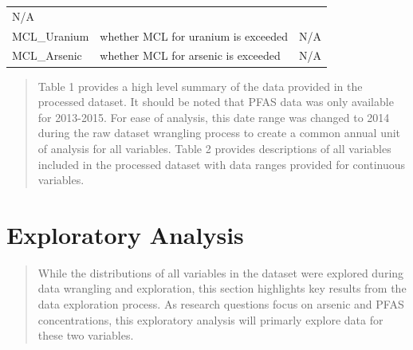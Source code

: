 \documentclass[12pt,]{article}
\begin{document}
\begin{longtable}[]{@{}lll@{}}
\begin{minipage}[t]{0.23\columnwidth}
N/A\strut
\end{minipage}\tabularnewline
\begin{minipage}[t]{0.22\columnwidth}\raggedright
MCL\_Uranium\strut
\end{minipage} & \begin{minipage}[t]{0.46\columnwidth}\raggedright
whether MCL for uranium is exceeded\strut
\end{minipage} & \begin{minipage}[t]{0.23\columnwidth}\raggedright
N/A\strut
\end{minipage}\tabularnewline
\begin{minipage}[t]{0.22\columnwidth}\raggedright
MCL\_Arsenic\strut
\end{minipage} & \begin{minipage}[t]{0.46\columnwidth}\raggedright
whether MCL for arsenic is exceeded\strut
\end{minipage} & \begin{minipage}[t]{0.23\columnwidth}\raggedright
N/A\strut
\end{minipage}\tabularnewline
\bottomrule
\end{longtable}

\begin{quote}
Table 1 provides a high level summary of the data provided in the
processed dataset. It should be noted that PFAS data was only available
for 2013-2015. For ease of analysis, this date range was changed to 2014
during the raw dataset wrangling process to create a common annual unit
of analysis for all variables. Table 2 provides descriptions of all
variables included in the processed dataset with data ranges provided
for continuous variables.
\end{quote}

\newpage

\hypertarget{exploratory-analysis}{%
\section{Exploratory Analysis}\label{exploratory-analysis}}

\begin{quote}
While the distributions of all variables in the dataset were explored
during data wrangling and exploration, this section highlights key
results from the data exploration process. As research questions focus
on arsenic and PFAS concentrations, this exploratory analysis will
primarly explore data for these two variables.
\end{quote}
\end{document}
